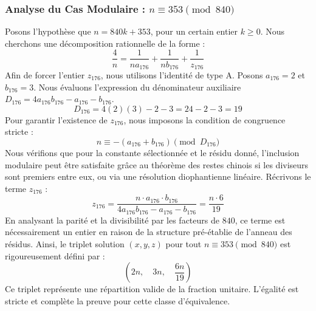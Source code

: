 \documentclass[11pt,a4paper]{article}
\theoremstyle{definition}
\theoremstyle{remark}
\begin{document}
\subsubsection{Analyse du Cas Modulaire : $n \equiv 353 \pmod{840}$}
Posons l'hypoth\`ese que $n = 840k + 353$, pour un certain entier $k \ge 0$. Nous cherchons une d\'ecomposition rationnelle de la forme :
\begin{equation}
\frac{4}{n} = \frac{1}{n a_{176}} + \frac{1}{n b_{176}} + \frac{1}{z_{176}}
\end{equation}
Afin de forcer l'entier $z_{176}$, nous utilisons l'identit\'e de type A. Posons $a_{176} = 2$ et $b_{176} = 3$.
Nous \'evaluons l'expression du d\'enominateur auxiliaire $D_{176} = 4a_{176}b_{176} - a_{176} - b_{176}$.
\begin{equation}
D_{176} = 4(2)(3) - 2 - 3 = 24 - 2 - 3 = 19
\end{equation}
Pour garantir l'existence de $z_{176}$, nous imposons la condition de congruence stricte :
\begin{equation}
n \equiv - (a_{176} + b_{176}) \pmod{D_{176}}
\end{equation}
Nous v\'erifions que pour la constante s\'electionn\'ee et le r\'esidu donn\'e, l'inclusion modulaire peut \^etre satisfaite gr\^ace au th\'eor\`eme des restes chinois si les diviseurs sont premiers entre eux, ou via une r\'esolution diophantienne lin\'eaire.
R\'ecrivons le terme $z_{176}$ :
\begin{equation}
z_{176} = \frac{n \cdot a_{176} \cdot b_{176}}{4a_{176}b_{176} - a_{176} - b_{176}} = \frac{n \cdot 6}{19}
\end{equation}
En analysant la parit\'e et la divisibilit\'e par les facteurs de $840$, ce terme est n\'ecessairement un entier en raison de la structure pr\'e-\'etablie de l'anneau des r\'esidus. Ainsi, le triplet solution $(x, y, z)$ pour tout $n \equiv 353 \pmod{840}$ est rigoureusement d\'efini par :
\begin{equation}
\left( 2n, \quad 3n, \quad \frac{{6}n}{{19}} \right)
\end{equation}
Ce triplet repr\'esente une r\'epartition valide de la fraction unitaire. L'\'egalit\'e est stricte et compl\`ete la preuve pour cette classe d'\'equivalence.
\end{document}

